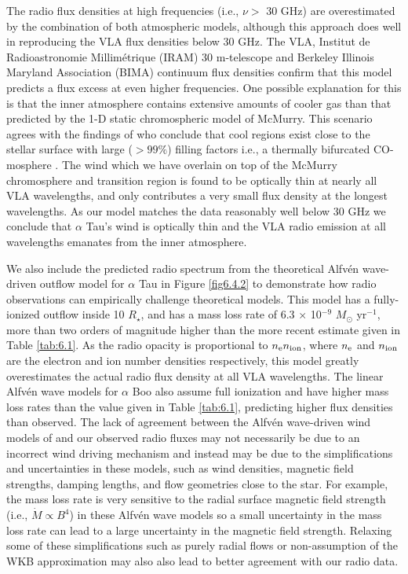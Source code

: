 The radio flux densities at high frequencies (i.e., $\nu >$ 30 GHz) are overestimated by the combination of both atmospheric models, although this approach does well in reproducing the VLA flux densities below 30 GHz. The VLA, Institut de Radioastronomie Millim\'{e}trique (IRAM) 30 m-telescope and Berkeley Illinois Maryland Association (BIMA) continuum flux densities confirm that this model predicts a flux excess at even higher frequencies. One possible explanation for this is that the inner atmosphere contains extensive amounts of cooler gas than that predicted by the 1-D static chromospheric model of McMurry. This scenario agrees with the findings of \cite{wiedemann_1994} who conclude that cool regions exist close to the stellar surface with large ($> 99 \%$) filling factors i.e., a thermally bifurcated CO-mosphere \citep{ayres_1996}. The wind which we have overlain on top of the McMurry chromosphere and transition region is found to be optically thin at nearly all VLA wavelengths, and only contributes a very small flux density at the longest wavelengths. As our model matches the data reasonably well below 30 GHz we conclude that $\alpha$ Tau's wind is optically thin and the VLA radio emission at all wavelengths emanates from the inner atmosphere. 

We also include the predicted radio spectrum from the theoretical Alfv\'{e}n wave-driven outflow model for $\alpha$ Tau \citep{krogulec_1989} in Figure \ref{fig6.4.2} to demonstrate how radio observations can empirically challenge theoretical models. This model has a fully-ionized outflow inside 10 $R_{\star}$, and has a mass loss rate of  6.3 $\times$ 10$^{-9}$ $M_{\odot}$ yr$^{-1}$, more than two orders of magnitude higher than the more recent estimate given in Table \ref{tab:6.1}. As the radio opacity is proportional to $n _{\rm{e}} n _{\rm{ion}}$, where $n_{\rm{e}}$ and $n_{\rm{ion}}$ are the electron and ion number densities respectively, this model greatly overestimates the actual radio flux density at all VLA wavelengths. The linear Alfv\'{e}n wave models for $\alpha$ Boo \citep{krogulec_1988} also assume full ionization and have higher mass loss rates than the value given in Table \ref{tab:6.1}, predicting higher flux densities than observed. The lack of agreement between the Alfv\'en wave-driven wind models of \cite{krogulec_1988,krogulec_1989} and our observed radio fluxes may not necessarily be due to an incorrect  wind driving mechanism and instead may be due to the simplifications and  uncertainties in these models, such as wind densities, magnetic field strengths, damping lengths, and flow geometries close to the star. For example, the mass loss rate is very sensitive to the radial surface magnetic field strength (i.e., $\dot{M} \propto B^4$) in these Alfv\'en wave models \citep{holzer_1983} so a small uncertainty in the mass loss rate can lead to a large uncertainty in the magnetic field strength. Relaxing some of these simplifications such as purely radial flows or non-assumption of the WKB approximation \citep{charbonneau_1995} may also also lead to better agreement with our radio data.

